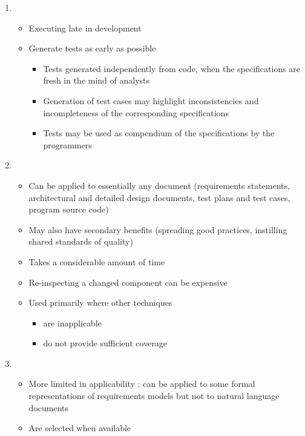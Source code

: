 \begin{enumerate}
    \item {}
    \begin{itemize}
        \item Executing late in development
        \item Generate tests as early as possible
        \begin{itemize}
            \item Tests generated independently from code, when the specifications are fresh in the mind of analysts
            \item Generation of test cases may highlight inconsistencies and incompleteness of the corresponding specifications
            \item Tests may be used as compendium of the specifications by the programmers
        \end{itemize}
    \end{itemize}
    \item {}
    \begin{itemize}
        \item Can be applied to essentially any document (requirements statements, architectural and detailed design documents, test plans and test cases, program source code)
        \item May also have secondary benefits (spreading good practices, instilling shared standards of quality)
        \item Takes a considerable amount of time
        \item Re-inspecting a changed component can be expensive
        \item Used primarily where other techniques
         \begin{itemize}
            \item are inapplicable
            \item do not provide sufficient coverage
        \end{itemize}
    \end{itemize}
    \item {}
    \begin{itemize}
        \item More limited in applicability : can be applied to some formal representations of requirements models but not to natural language documents
        \item Are selected when available
        \begin{itemize}

\end{itemize}
\end{itemize}
\end{enumerate}
